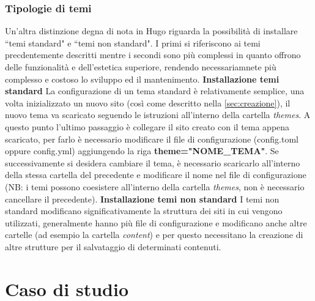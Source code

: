 \documentclass[target=bach,aauheader=]{thud}
\begin{document}
\subsection{Tipologie di temi}
Un'altra distinzione degna di nota in Hugo riguarda la possibilità di installare ``temi standard" e ``temi non standard". I primi si riferiscono ai temi precdentemente descritti mentre i secondi sono più complessi in quanto offrono delle funzionalità e dell'estetica superiore, rendendo necessariamnete più complesso e costoso lo sviluppo ed il mantenimento.
\newline \newline
\textbf{{\fontsize{12}{14}\selectfont Installazione temi standard}}
\newline \newline
La configurazione di un tema standard è relativamente semplice, una volta inizializzato un nuovo sito (così come descritto nella \cref{sec:creazione}), il nuovo tema va scaricato seguendo le istruzioni all'interno della cartella \textit{themes}. 
A questo punto l'ultimo passaggio è collegare il sito creato con il tema appena scaricato, per farlo è necessario modificare il file di configurazione (config.toml oppure config.yml) aggiungendo la riga \textbf{theme="NOME\_TEMA"}.
\newline
Se successivamente si desidera cambiare il tema, è necessario scaricarlo all'interno della stessa cartella del precedente e modificare il nome nel file di configurazione (NB: i temi possono coesistere all'interno della cartella \textit{themes}, non è necessario cancellare il precedente).
\newline \newline
\textbf{{\fontsize{12}{14}\selectfont Installazione temi non standard}}
\newline \newline
I temi non standard modificano significativamente la struttura dei siti in cui vengono utilizzati, generalmente hanno più file di configurazione e modificano anche altre cartelle (ad esempio la cartella \textit{content}) e per questo necessitano la creazione di altre strutture per il salvataggio di determinati contenuti.


\chapter{Caso di studio}\label{cap:casostudio}
\end{document}
